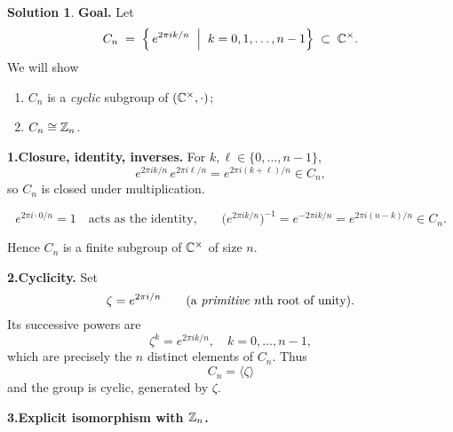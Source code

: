 \documentclass[12pt]{article}
\theoremstyle{definition} %
\newtheorem{solution}{Solution}
\theoremstyle{plain} %
\begin{document}
            \begin{solution}
              \textbf{Goal.}\;
              Let
              \[
                 C_{n}
                    \;=\;
                 \Bigl\{\,e^{2\pi i k/n}\;\Bigm|\;k=0,1,\dots,n-1\Bigr\}
                 \;\subset\;\Bbb C^{\times}.
              \]
              We will show
              \begin{enumerate}[]
                 \item $C_{n}$ is a \emph{cyclic} subgroup of $(\Bbb C^{\times},\cdot)$;
                 \item $C_{n}\cong\Bbb Z_{n}$.
              \end{enumerate}
              
              \bigskip
              \textbf{1.\;Closure, identity, inverses.}
              For $k,\ell\in\{0,\dots,n-1\}$,
              \[
                 e^{2\pi i k/n}\,e^{2\pi i \ell/n}
                    =e^{2\pi i (k+\ell)/n}
                    \in C_{n},
              \]
              so $C_{n}$ is closed under multiplication.
              
              \[
                 e^{2\pi i\cdot 0/n}=1
                 \quad\text{acts as the identity,}\qquad
                 \bigl(e^{2\pi i k/n}\bigr)^{-1}=e^{-2\pi i k/n}=e^{2\pi i (n-k)/n}\in C_{n}.
              \]
              
              Hence $C_{n}$ is a finite subgroup of $\Bbb C^{\times}$ of size $n$.
              
              \bigskip
              \textbf{2.\;Cyclicity.}
              Set
              \[
                 \zeta=e^{2\pi i/n}\qquad(\text{a \emph{primitive} $n$th root of unity}).
              \]
              Its successive powers are
              \[
                 \zeta^{k}=e^{2\pi i k/n},\quad k=0,\dots,n-1,
              \]
              which are precisely the $n$ distinct elements of $C_{n}$.
              Thus
              \[
                 C_{n}=\langle\zeta\rangle
              \]
              and the group is cyclic, generated by $\zeta$.
              
              \bigskip
              \textbf{3.\;Explicit isomorphism with \(\Bbb Z_{n}\).}
              

\end{solution}
\end{document}
